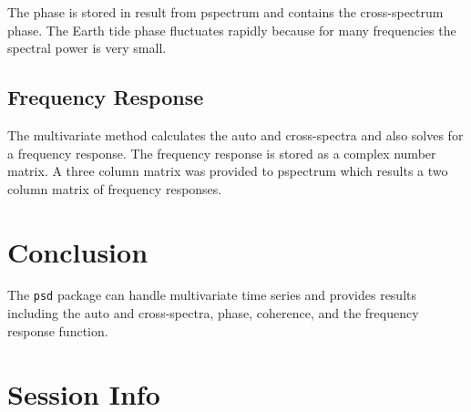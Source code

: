 \documentclass[11pt]{article}\usepackage[]{graphicx}\usepackage[]{xcolor}
\newcommand{\Rcmd}[1]{\texttt{#1}}
\begin{document}
The phase is stored in result from pspectrum and contains the cross-spectrum phase.  The Earth tide phase fluctuates rapidly because for many frequencies the spectral power is very small.









\subsection{Frequency Response}

The multivariate method calculates the auto and cross-spectra and also solves for a frequency response.  The frequency response is stored as a complex number matrix.  A three column matrix was provided to pspectrum which results a two column matrix of frequency responses. 










\section{Conclusion}

The \Rcmd{psd} package can handle multivariate time series and provides results including the auto and cross-spectra, phase, coherence, and the frequency response function.  


\section*{Session Info}





\end{document}
